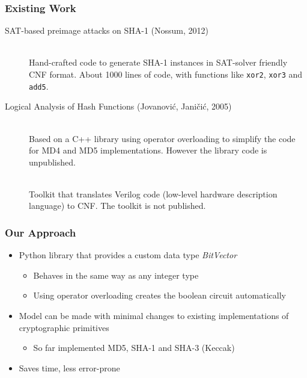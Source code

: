 \documentclass{beamer}
\begin{document}
\begin{frame}
\frametitle{Existing Work}
\begin{description}
\item[SAT-based preimage attacks on SHA-1 (Nossum, 2012)]~\\ Hand-crafted code to generate SHA-1 instances in SAT-solver friendly CNF format. About 1000 lines of code, with functions like \texttt{xor2}, \texttt{xor3} and \texttt{add5}.
\item[Logical Analysis of Hash Functions (Jovanović, Janičić, 2005)]~\\ Based on a C++ library using operator overloading to simplify the code for MD4 and MD5 implementations. However the library code is unpublished.
\item[\parbox{11cm}{A SAT-based preimage analysis of reduced Keccak hash functions (Morawiecki, Srebrny, 2010)}]~\\ Toolkit that translates Verilog code (low-level hardware description language) to CNF. The toolkit is not published.
\end{description}
\end{frame}

\begin{frame}
\frametitle{Our Approach}
\begin{itemize}
\item Python library that provides a custom data type \textit{BitVector}
\begin{itemize}
	\item Behaves in the same way as any integer type
	\item Using operator overloading creates the boolean circuit automatically
\end{itemize}
\item Model can be made with minimal changes to existing implementations of cryptographic primitives
\begin{itemize}
	\item So far implemented MD5, SHA-1 and SHA-3 (Keccak)
\end{itemize}
\item Saves time, less error-prone
\end{itemize}
\end{frame}
\end{document}
